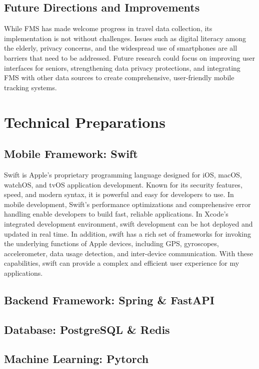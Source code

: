 \documentclass[12pt,two side]{report}
\begin{document}
\section{Future Directions and Improvements}
While FMS has made welcome progress in travel data collection, its implementation is not without challenges. Issues such as digital literacy among the elderly, privacy concerns, and the widespread use of smartphones are all barriers that need to be addressed. Future research could focus on improving user interfaces for seniors, strengthening data privacy protections, and integrating FMS with other data sources to create comprehensive, user-friendly mobile tracking systems.

\chapter{Technical Preparations}
\section{Mobile Framework: Swift}

Swift is Apple's proprietary programming language designed for iOS, macOS, watchOS, and tvOS application development. Known for its security features, speed, and modern syntax, it is powerful and easy for developers to use. In mobile development, Swift's performance optimizations and comprehensive error handling enable developers to build fast, reliable applications. In Xcode's integrated development environment, swift development can be hot deployed and updated in real time. In addition, swift has a rich set of frameworks for invoking the underlying functions of Apple devices, including GPS, gyroscopes, accelerometer, data usage detection, and inter-device communication. With these capabilities, swift can provide a complex and efficient user experience for my applications.

\section{Backend Framework: Spring \& FastAPI}
\section{Database: PostgreSQL \& Redis}
\section{Machine Learning: Pytorch}
\end{document}

